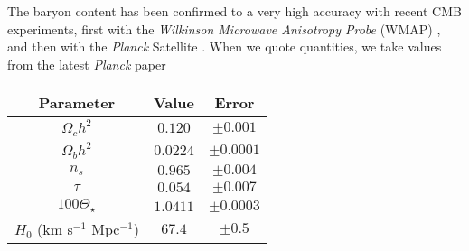 The baryon content has been confirmed to a very high accuracy with recent CMB experiments, first with the \textit{Wilkinson Microwave Anisotropy Probe} (WMAP) \citep{2007ApJS..170..377S}, and then with the \textit{Planck} Satellite . When we quote quantities, we take values from the latest \textit{Planck} paper \cite{2018arXiv180706209P}


\begin{center}\label{table:params}
 \begin{tabular}{||c c c||} 
 \hline
 Parameter & Value & Error \\
 \hline\hline
 $\Omega_c h^2$ & $0.120$ & $\pm 0.001$ \\
 \hline
 $\Omega_b h^2$ & $0.0224$ & $\pm 0.0001$ \\
 \hline
  $n_s$ & $0.965$ & $\pm 0.004$ \\
 \hline
  $\tau$  & $0.054$ & $\pm 0.007$ \\
 \hline
  $100 \Theta_\star$ & $1.0411$ & $\pm 0.0003$ \\
 \hline
 $H_0$ (km s$^{-1}$ Mpc$^{-1}$) & $67.4$ & $\pm 0.5$ \\
 \hline
\end{tabular}
\end{center}




